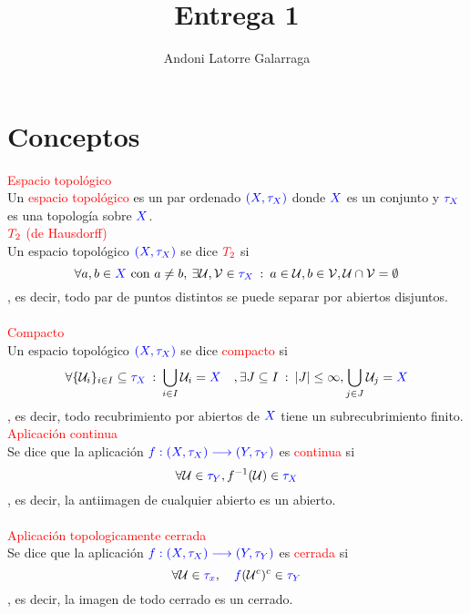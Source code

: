 \documentclass{article}
\title{Entrega 1}
\author{Andoni Latorre Galarraga}
\date{}
\begin{document}
\maketitle

\section*{\textcolor{WildStrawberry}{Conceptos}}

\textcolor{red}{Espacio topológico}\\
Un \textcolor{red}{espacio topológico} es un par ordenado $\textcolor{blue}{(X,\tau_X)}$ donde $\textcolor{blue}{X}$ es un conjunto y $\textcolor{blue}{\tau_X}$ es una topología sobre $\textcolor{blue}{X}$.\\

$\textcolor{red}{T_2}$ \textcolor{red}{(de Hausdorff)}\\
Un espacio topológico $\textcolor{blue}{(X,\tau_X)}$ se dice $\textcolor{red}{T_2}$ si
$$
\forall a,b\in \textcolor{blue}{X} \text{ con } a \ne b, \: \exists \mathcal{U},\mathcal{V}\in \textcolor{blue}{\tau_X} \: : \: a\in\mathcal{U}, b\in\mathcal{V}, \mathcal{U}\cap\mathcal{V}=\emptyset
$$
, es decir, todo par de puntos distintos se puede separar por abiertos disjuntos.\\\\

\textcolor{red}{Compacto}\\
Un espacio topológico $\textcolor{blue}{(X,\tau_X)}$ se dice \textcolor{red}{compacto} si
$$
\forall \{\mathcal{U}_i\}_{i\in I} \subseteq \textcolor{blue}{\tau_X}\: :\: \bigcup_{i\in I} \mathcal{U}_i = \textcolor{blue}{X} \quad, \exists J\subseteq I \: :\: |J|\le\infty, \bigcup_{j\in J} \mathcal{U}_j = \textcolor{blue}{X}
$$
, es decir, todo recubrimiento por abiertos de $\textcolor{blue}{X}$ tiene un subrecubrimiento finito.\\

\textcolor{red}{Aplicación continua}\\
Se dice que la aplicación $\textcolor{blue}{f:(X,\tau_X)\longrightarrow (Y, \tau_Y)}$ es \textcolor{red}{continua} si
$$
\forall \mathcal{U}\in \textcolor{blue}{\tau_Y}, f^{-1}(\mathcal{U})\in \textcolor{blue}{\tau_X}
$$
, es decir, la antiimagen de cualquier abierto es un abierto.\\\\

\textcolor{red}{Aplicación topologicamente cerrada}\\
Se dice que la aplicación $\textcolor{blue}{f:(X,\tau_X)\longrightarrow (Y, \tau_Y)}$ es \textcolor{red}{cerrada} si
$$
\forall \mathcal{U} \in \textcolor{blue}{\tau_x}, \quad \textcolor{blue}{f}(\mathcal{U}^c)^c\in \textcolor{blue}{\tau_Y}
$$
, es decir, la imagen de todo cerrado es un cerrado.\\\\
\end{document}
